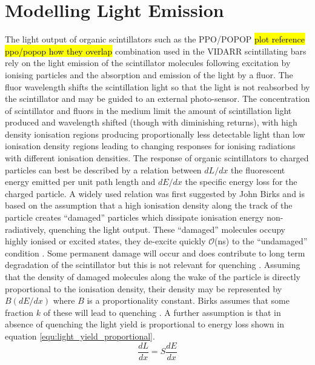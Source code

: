 \section{Modelling Light Emission}\label{sec:GEANT4Simulation_ModellingLightEmission}
The light output of organic scintillators such as the PPO/POPOP \hl{plot reference ppo/popop how they overlap} combination used in the VIDARR scintillating bars rely on the light emission of the scintillator molecules following excitation by ionising particles and the absorption and emission of the light by a fluor. The fluor wavelength shifts the scintillation light so that the light is not reabsorbed by the scintillator and may be guided to an external photo-sensor. The concentration of scintillator and fluors in the medium limit the amount of scintillation light produced and wavelength shifted (though with diminishing returns), with high density ionisation regions producing proportionally less detectable light than low ionisation density regions leading to changing responses for ionising radiations with different ionisation densities. The response of organic scintillators to charged particles can best be described by a relation between $dL/dx$ the fluorescent energy emitted per unit path length and $dE/dx$ the specific energy loss for the charged particle. A widely used relation was first suggested by John Birks \cite{birks_1964} and is based on the assumption that a high ionisation density along the track of the particle creates ``damaged'' particles which dissipate ionisation energy non-radiatively, quenching the light output. These “damaged” molecules occupy highly ionised or excited states, they de-excite quickly $\mathcal{O}$(ns) to the “undamaged” condition \cite{knoll_2010}. Some permanent damage will occur and does contribute to long term degradation of the scintillator but this is not relevant for quenching \cite{knoll_2010}. Assuming that the density of damaged molecules along the wake of the particle is directly proportional to the ionisation density, their density may be represented by $B(dE/dx)$ where $B$ is a proportionality constant. Birks assumes that some fraction $k$ of these will lead to quenching \cite{craun_1970}. A further assumption is that in absence of quenching the light yield is proportional to energy loss shown in equation \ref{equ:light_yield_proportional}.
\begin{equation}
\frac{dL}{dx} = S\frac{dE}{dx}
\label{equ:light_yield_proportional}
\end{equation}
